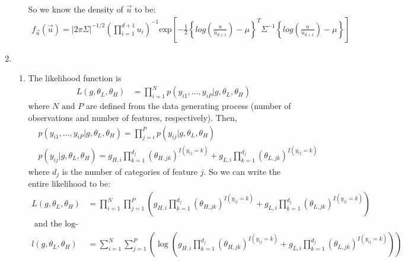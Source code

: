 \documentclass[paper=a4, fontsize=11pt]{scrartcl}
\newcommand{\parens}[1]{ \left( #1 \right) }
\begin{document}
\begin{enumerate}[1.]
\begin{enumerate}[1]
        So we know the density of $\vec{u}$ to be:
        \begin{align*}
          f_{\vec{u}}(\vec{u}) = |2\pi \Sigma|^{-1/2}
                        \parens{ \prod_{i = 1}^{d+1}{u_{i}} }^{-1}
                        \mbox{exp}
                          \left[
                            -\frac{1}{2}
                            \left\{
                              log\parens{ \frac{u}{u_{d+1}}}-\mu \right\}^T\Sigma^{-1}\left\{log\parens{ \frac{u}{u_{d+1}} }-\mu
                            \right\}
                          \right]
        \end{align*}
    \end{enumerate}
  \item
    \begin{enumerate}[1]
      \item The likelihood function is
        \begin{align*}
          L(g, \theta_L, \theta_H) &= \prod_{i = 1}^{N}{p(y_{i1},\ldots,y_{iP} | g, \theta_L, \theta_H)}
        \end{align*}
        where $N \text{ and } P$ are defined from the data generating process (number of observations and number of features, respectively). Then,
        \begin{align*}
          & p(y_{i1},\ldots,y_{iP} | g, \theta_L, \theta_H) = \prod_{j = i}^{P}{p(y_{ij} | g, \theta_L, \theta_H)} \\
          & p(y_{ij} | g, \theta_L, \theta_H) = g_{H,i} \prod_{k = 1}^{d_j}{(\theta_{H,jk})^{I(y_{ij} = k)}} + g_{L,i} \prod_{k = 1}^{d_j}{(\theta_{L,jk})^{I(y_{ij} = k)}}
        \end{align*}
        where $d_j$ is the number of categories of feature $j$. So we can write the entire likelihood to be: 
        \begin{align*}
          L(g, \theta_L, \theta_H) &=
            \prod_{i = 1}^{N}{\prod_{j = 1}^{P}{\parens{
                g_{H,i} \prod_{k = 1}^{d_j}{(\theta_{H,jk})^{I(y_{ij} = k)}} + g_{L,i} \prod_{k = 1}^{d_j}{(\theta_{L,jk})^{I(y_{ij} = k)}}
            }}} \\
          \text{ and the log-likelihood: } \\
          l(g, \theta_L, \theta_H) &=
            \sum_{i = 1}^{N} \sum_{j=1}^{P} \parens{\log{ \parens{ 
              g_{H,i} \prod_{k = 1}^{d_j}{(\theta_{H,jk})^{I(y_{ij} = k)}} + g_{L,i} \prod_{k = 1}^{d_j}{(\theta_{L,jk})^{I(y_{ij} = k)}} 
            }}}
        \end{align*}
    \end{enumerate}
\end{enumerate}
\end{document}
